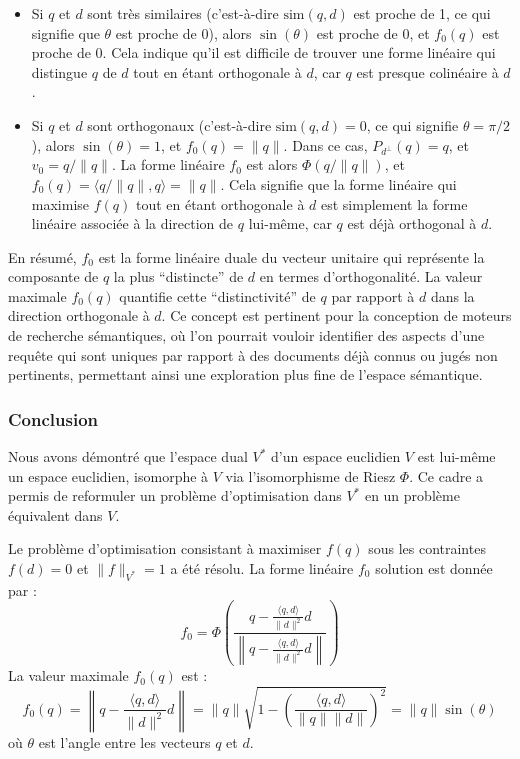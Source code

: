 \documentclass[11pt,a4paper]{report}
\begin{document}
\begin{enumerate}
\begin{enumerate}
\begin{itemize}
    \item
      Si \(q\) et \(d\) sont très similaires (c'est-à-dire
      \(\text{sim}(q,d)\) est proche de 1, ce qui signifie que
      \(\theta\) est proche de 0), alors \(\sin(\theta)\) est proche de
      0, et \(f_0(q)\) est proche de 0. Cela indique qu'il est difficile
      de trouver une forme linéaire qui distingue \(q\) de \(d\) tout en
      étant orthogonale à \(d\), car \(q\) est presque colinéaire à
      \(d\).
    \item
      Si \(q\) et \(d\) sont orthogonaux (c'est-à-dire
      \(\text{sim}(q,d) = 0\), ce qui signifie \(\theta = \pi/2\)),
      alors \(\sin(\theta) = 1\), et \(f_0(q) = \|q\|\). Dans ce cas,
      \(P_{d^\perp}(q) = q\), et \(v_0 = q/\|q\|\). La forme linéaire
      \(f_0\) est alors \(\Phi(q/\|q\|)\), et
      \(f_0(q) = \langle q/\|q\|, q \rangle = \|q\|\). Cela signifie que
      la forme linéaire qui maximise \(f(q)\) tout en étant orthogonale
      à \(d\) est simplement la forme linéaire associée à la direction
      de \(q\) lui-même, car \(q\) est déjà orthogonal à \(d\).
    \end{itemize}

    En résumé, \(f_0\) est la forme linéaire duale du vecteur unitaire
    qui représente la composante de \(q\) la plus ``distincte'' de \(d\)
    en termes d'orthogonalité. La valeur maximale \(f_0(q)\) quantifie
    cette ``distinctivité'' de \(q\) par rapport à \(d\) dans la
    direction orthogonale à \(d\). Ce concept est pertinent pour la
    conception de moteurs de recherche sémantiques, où l'on pourrait
    vouloir identifier des aspects d'une requête qui sont uniques par
    rapport à des documents déjà connus ou jugés non pertinents,
    permettant ainsi une exploration plus fine de l'espace sémantique.
  \end{enumerate}
\end{enumerate}

\hypertarget{conclusion}{%
\subsubsection{Conclusion}\label{conclusion}}

Nous avons démontré que l'espace dual \(V^*\) d'un espace euclidien
\(V\) est lui-même un espace euclidien, isomorphe à \(V\) via
l'isomorphisme de Riesz \(\Phi\). Ce cadre a permis de reformuler un
problème d'optimisation dans \(V^*\) en un problème équivalent dans
\(V\).

Le problème d'optimisation consistant à maximiser \(f(q)\) sous les
contraintes \(f(d)=0\) et \(\|f\|_{V^*}=1\) a été résolu. La forme
linéaire \(f_0\) solution est donnée par :
\[ f_0 = \Phi\left(\frac{q - \frac{\langle q, d \rangle}{\|d\|^2} d}{\left\|q - \frac{\langle q, d \rangle}{\|d\|^2} d\right\|}\right) \]
La valeur maximale \(f_0(q)\) est :
\[ f_0(q) = \left\|q - \frac{\langle q, d \rangle}{\|d\|^2} d\right\| = \|q\| \sqrt{1 - \left(\frac{\langle q, d \rangle}{\|q\| \|d\|}\right)^2} = \|q\| \sin(\theta) \]
où \(\theta\) est l'angle entre les vecteurs \(q\) et \(d\).
\end{document}
